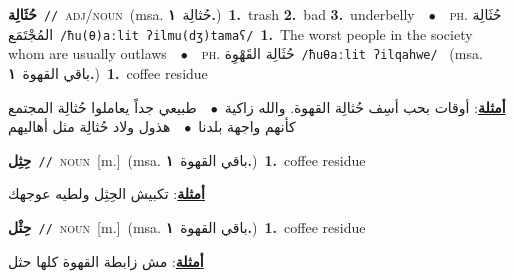 \documentclass[10pt,a4paper,twoside]{article} %
\begin{document}
\begin{multicols}{2}
{{{{{{{{{{\setlength\topsep{0pt}\textbf{\foreignlanguage{arabic}{حُثَالِة}}\ {\color{gray}\texttt{//}\color{black}}\ \textsc{adj/noun}\ \color{gray}(msa. \foreignlanguage{arabic}{حُثالِة}~\foreignlanguage{arabic}{\textbf{١.}})\color{black}\ \textbf{1.}~trash  \textbf{2.}~bad  \textbf{3.}~underbelly\ \ $\bullet$\ \ \textsc{ph.} \color{gray} \foreignlanguage{arabic}{حُثَالِة المُجْتَمَع}\color{black}\ {\color{gray}\texttt{/{\sffamily ħu(θ)aːlit ʔilmu(dʒ)tamaʕ}/}\color{black}}\ \textbf{1.}~The worst people in the society whom are usually outlaws\ \ $\bullet$\ \ \textsc{ph.} \color{gray} \foreignlanguage{arabic}{حُثَالِة القَهْوِة}\color{black}\ {\color{gray}\texttt{/{\sffamily ħuθaːlit ʔilqahwe}/}\color{black}}\ \color{gray} (msa. \foreignlanguage{arabic}{باقي القهوة}~\foreignlanguage{arabic}{\textbf{١.}})\color{black}\ \textbf{1.}~coffee residue\  \begin{flushright}\color{gray}\foreignlanguage{arabic}{\textbf{\underline{\foreignlanguage{arabic}{أمثلة}}}: أوقات بحب أسِف حُثالِة القهوة. والله زاكية\ $\bullet$\ \  طبيعي جداً يعاملوا حُثالِة المجتمع كأنهم واجهة بلدنا\ $\bullet$\ \  هذول ولاد حُثالِة مثل أهاليهم}\end{flushright}\color{black}} \vspace{2mm}

{\setlength\topsep{0pt}\textbf{\foreignlanguage{arabic}{حِثِل}}\ {\color{gray}\texttt{//}\color{black}}\ \textsc{noun}\ [m.]\ \color{gray}(msa. \foreignlanguage{arabic}{باقي القهوة}~\foreignlanguage{arabic}{\textbf{١.}})\color{black}\ \textbf{1.}~coffee residue\  \begin{flushright}\color{gray}\foreignlanguage{arabic}{\textbf{\underline{\foreignlanguage{arabic}{أمثلة}}}: تكبيش الحِثِل ولطيه عوجهك}\end{flushright}\color{black}} \vspace{2mm}

{\setlength\topsep{0pt}\textbf{\foreignlanguage{arabic}{حِثْل}}\ {\color{gray}\texttt{//}\color{black}}\ \textsc{noun}\ [m.]\ \color{gray}(msa. \foreignlanguage{arabic}{باقي القهوة}~\foreignlanguage{arabic}{\textbf{١.}})\color{black}\ \textbf{1.}~coffee residue\  \begin{flushright}\color{gray}\foreignlanguage{arabic}{\textbf{\underline{\foreignlanguage{arabic}{أمثلة}}}: مش زابطة القهوة كلها حثل}\end{flushright}\color{black}} \vspace{2mm}

}}}}}}}}}
\end{multicols}
\end{document}
